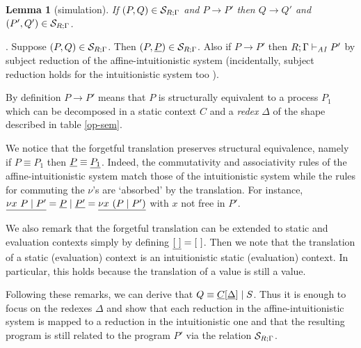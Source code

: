 \documentclass[11pt]{article}
\newtheorem{lemma}[theorem]{Lemma}
\newcommand{\Proof}{\noindent {\sc Proof}. }
\newcommand{\cl}[1]{{\cal #1}}          \newcommand{\la}{\langle}               \newcommand{\ra}{\rangle}
\newcommand{\arrow}{\rightarrow}        \newcommand{\trarrow}{\stackrel{*}{\rightarrow}}        \newcommand{\limp}{\multimap} \newcommand{\bang}{\oc}
\newcommand{\new}[2]{\nu #1 \ #2}
\begin{document}
\begin{lemma}[simulation]\label{simulation-lemma}
If $(P,Q)\in \cl{S}_{R;\Gamma}$ and $P\arrow P'$ then
$Q\arrow Q'$ and $(P',Q')\in \cl{S}_{R;\Gamma}$.
\end{lemma}
\Proof
Suppose $(P,Q)\in \cl{S}_{R;\Gamma}$.
Then $(P,\forget{P}) \in \cl{S}_{R;\Gamma}$.
Also if $P\arrow P'$ then $R;\Gamma \vdash_{{\it AI}} P'$ by 
subject reduction of the affine-intuitionistic system
(incidentally, subject reduction holds for the intuitionistic 
system too \cite{Amadio09}).

By definition $P\arrow P'$ means that $P$ is structurally
equivalent to a process $P_1$ which can be decomposed 
in a static context $C$ and a {\em redex} $\Delta$ of the
shape described in table \ref{op-sem}.

We notice that the forgetful translation preserves structural equivalence,
namely if $P\equiv P_1$ then $\underline{P}\equiv \underline{P_{1}}$.
Indeed, the commutativity and associativity rules of the affine-intuitionistic
system match those of the intuitionistic system while the rules for commuting
the $\nu$'s are `absorbed' by the translation. For instance,
$\forget{\new{x}{P}\mid P'} = \forget{P}\mid \forget{P'} = \forget{\new{x}{(P\mid P')}}$
with $x$ not free in $P'$.

We also remark that the forgetful translation can be extended to static and evaluation contexts
simply by defining $\underline{[~]}=[~]$. Then we note that
the translation of a static (evaluation) context is an 
intuitionistic static (evaluation) context. In particular, this holds
because the translation of a value is still a value.

Following these remarks, we can derive that $Q\equiv \underline{C}[\underline{\Delta}] \mid S$.
Thus it is enough to focus on the redexes $\Delta$ and show that each reduction
in the affine-intuitionistic system is mapped to a reduction in the intuitionistic one 
and that the resulting program is still related to the program $P'$ via the
relation $\cl{S}_{R;\Gamma}$. 
\end{document}
